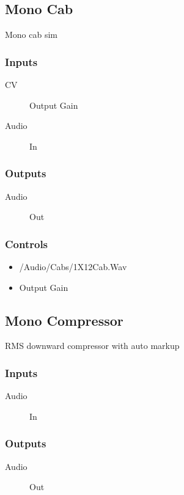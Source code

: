 \subsection{Mono Cab}

Mono cab sim



\subsubsection{Inputs}
\begin{description}
\item [CV] Output Gain
\item [Audio] In
\end{description}

\subsubsection{Outputs}
\begin{description}
\item [Audio] Out
\end{description}

\subsubsection{Controls}
\begin{itemize}
\item /Audio/Cabs/1X12Cab.Wav
\item Output Gain
\end{itemize}

\subsection{Mono Compressor}

RMS downward compressor with auto markup



\subsubsection{Inputs}
\begin{description}
\item [Audio] In
\end{description}

\subsubsection{Outputs}
\begin{description}
\item [Audio] Out
\end{description}

